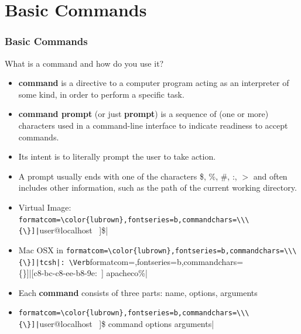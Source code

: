 \documentclass[10pt,t]{beamer}
\newcommand*\mybigstar{\textcolor{lubrown!90!yellow}{%
  \ensuremath{\bigstar}}}
\newcommand{\Verblubrown}[1]{\Verb[formatcom=\color{lubrown},fontseries=b,commandchars=\\\{\}]|#1|}
\begin{document}
\section{Basic Commands}
\begin{frame}[fragile]
  \frametitle{Basic Commands}
  \begin{exampleblock}{What is a command and how do you use it?}
    \begin{itemize}
      \item \textbf{command} is a directive to a computer program acting as an interpreter of some kind, in order to perform a specific task.
      \item \textbf{command prompt} (or just \textbf{prompt}) is a sequence of (one or more) characters used in a command-line interface to indicate readiness to accept commands.
      \item Its intent is to literally prompt the user to take action. 
      \item A prompt usually ends with one of the characters \$, \%, \#, :, $>$ and often includes other information, such as the path of the current working directory.
      \item[$\mybigstar$] Virtual Image: \Verb[formatcom=\color{lubrown},fontseries=b,commandchars=\\\{\}]|[user@localhost ~]\$|
      \item[$\mybigstar$] Mac OSX in \Verblubrown{tcsh}: \Verb[formatcom=\color{lubrown},fontseries=b,commandchars=\\\{\}]|[c8-bc-c8-ee-b8-9e:~] apacheco\%|
      \item Each \textbf{command} consists of three parts: name, options, arguments
      \item[] \Verb[formatcom=\color{lubrown},fontseries=b,commandchars=\\\{\}]|[user@localhost ~]\$ command options arguments|
    \end{itemize}
  \end{exampleblock}
\end{frame}
\end{document}

